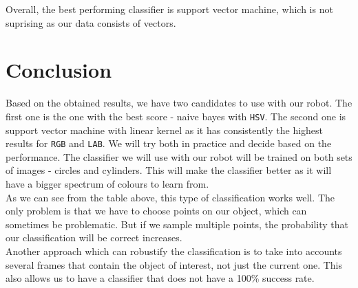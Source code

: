 \documentclass[12pt,a4paper]{article}
\begin{document}
	Overall, the best performing classifier is support vector machine, which is not suprising as our data consists of vectors.
	
	\section{Conclusion}

	Based on the obtained results, we have two candidates to use with our robot. The first one is the one with the best score - naive bayes with \texttt{HSV}. The second one is support vector machine with linear kernel as it has consistently the highest results for \texttt{RGB} and \texttt{LAB}. We will try both in practice and decide based on the performance. The classifier we will use with our robot will be trained on both sets of images - circles and cylinders. This will make the classifier better as it will have a bigger spectrum of colours to learn from.\\
	
	As we can see from the table above, this type of classification works well. The only problem is that we have to choose points on our object, which can sometimes be problematic. But if we sample multiple points, the probability that our classification will be correct increases. \\

	Another approach which can robustify the classification is to take into accounts several frames that contain the object of interest, not just the current one. This also allows us to have a classifier that does not have a 100\% success rate.
\end{document}
